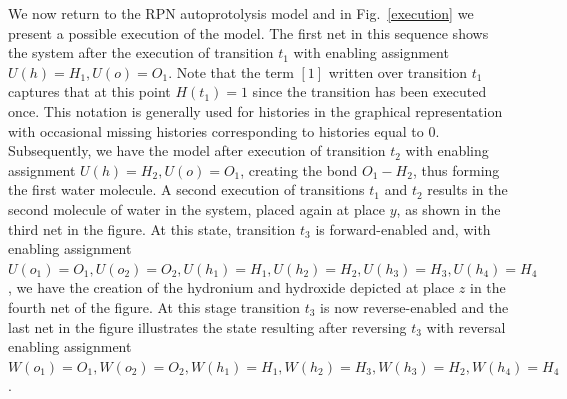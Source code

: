 \documentclass[runningheads]{llncs}
\begin{document}
We now return to the RPN autoprotolysis model and in Fig.~\ref{execution} we present
a possible execution of the model. The first net in this sequence shows the system after 
the execution of transition $t_1$ with enabling assignment $U(h)=H_1, U(o)=O_1$. Note
that the term $[1]$ written over transition $t_1$ captures that at this point $H(t_1)=1$ 
since the transition has been executed once.
This notation is generally used for histories in the graphical representation with occasional
missing histories corresponding to histories equal to $0$.
Subsequently,
we have the model after execution of transition $t_2$ with enabling assignment $U(h)=H_2,
U(o)=O_1$, creating the bond $O_1-H_2$, thus forming the first water molecule. A second
execution of transitions $t_1$ and $t_2$ results in the second molecule of water in the system,
placed again at place $y$, as shown in the third net in the figure. At this state, transition
$t_3$ is forward-enabled and,  with enabling assignment $U(o_1)=O_1, U(o_2)=O_2, U(h_1)=H_1, 
U(h_2)=H_2,U(h_3)=H_3,U(h_4)=H_4$, we have the creation of the hydronium and hydroxide
depicted at place $z$ in the fourth net of the figure. At this stage  transition $t_3$ is
now reverse-enabled and the last net in the figure illustrates the state resulting after
reversing $t_3$ with reversal enabling assignment $W(o_1)=O_1, W(o_2)=O_2, W(h_1)=H_1, 
W(h_2)=H_3,W(h_3)=H_2,W(h_4)=H_4$.
\end{document}
